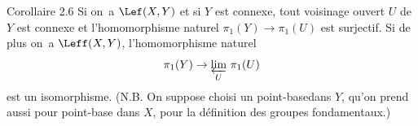 \label{X.2.6}
\begin{enonce*}{Corollaire 2.6\ndemark}
Si on~a $\Lef(X, Y)$ et si $Y$ est connexe, tout voisinage ouvert $U$ de $Y$ est connexe et l'homomorphisme naturel $\pi_1(Y)\to\pi_1(U)$ est surjectif. Si de plus on~a $\Leff(X, Y)$, l'homomorphisme naturel
\[
\pi_1(Y) \to \varprojlim_{U}\, \pi_1(U)
\]
est un isomorphisme. (N.B. On suppose choisi un \og point-base\fg dans $Y$, qu'on prend aussi pour point-base dans $X$, pour la d\'efinition des groupes fondamentaux.)
\end{enonce*}
